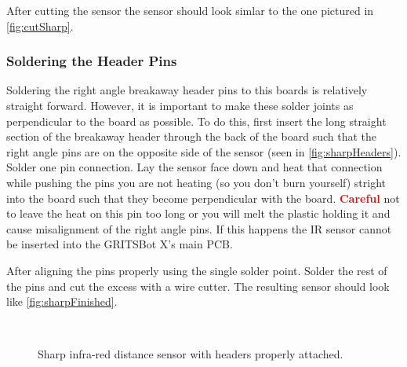 After cutting the sensor the sensor should look simlar to the one pictured in \cref{fig:cutSharp}.  
 
 \subsubsection{Soldering the Header Pins}
 \label{sec:sharpSolder}
 
 Soldering the right angle breakaway header pins to this boards is relatively straight forward. However, it is important to make these solder joints as perpendicular to the board as possible. To do this, first insert the long straight section of the breakaway header through the back of the board such that the right angle pins are on the opposite side of the sensor (seen in \cref{fig:sharpHeaders}). Solder one pin connection. Lay the sensor face down and heat that connection while pushing the pins you are not heating (so you don't burn yourself) stright into the board such that they become perpendicular with the board. \textbf{\textcolor{red}{Careful}} not to leave the heat on this pin too long or you will melt the plastic holding it and cause misalignment of the right angle pins. If this happens the IR sensor cannot be inserted into the GRITSBot X's main PCB.
 
 After aligning the pins properly using the single solder point. Solder the rest of the pins and cut the excess with a wire cutter. The resulting sensor should look like \cref{fig:sharpFinished}.
 
\begin{figure}[h!]
\centering
{}
\hfill
{}\\
\caption{Sharp infra-red distance sensor with headers properly attached.}
\label{fig:teesnySurfaceHeaderPerf}
\end{figure}

